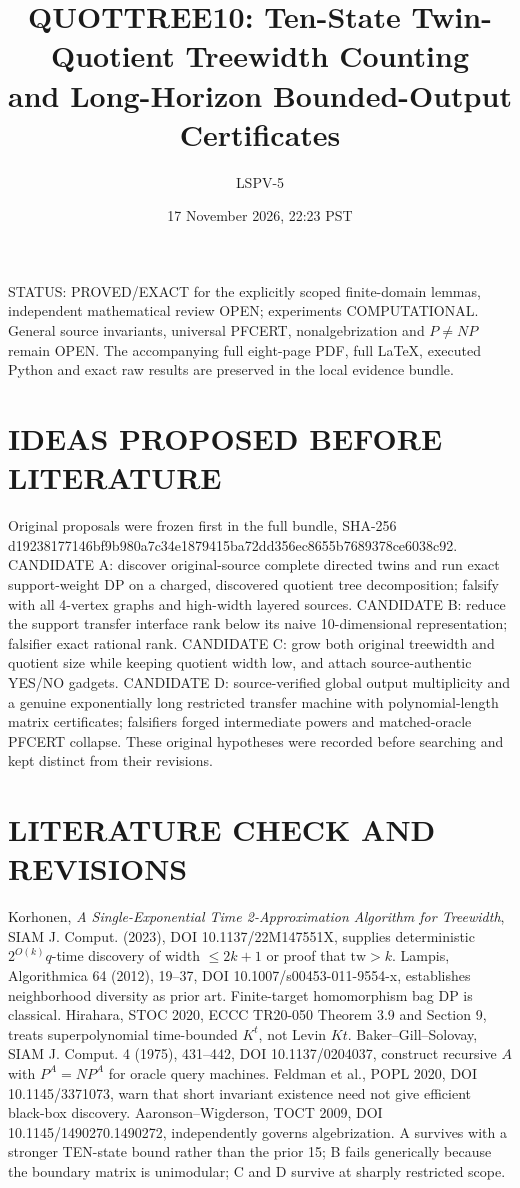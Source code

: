 \documentclass[11pt]{article}
\title{QUOTTREE10: Ten-State Twin-Quotient Treewidth Counting\\and Long-Horizon Bounded-Output Certificates}
\author{LSPV-5}
\date{17 November 2026, 22:23 PST}
\begin{document}
\maketitle
\noindent STATUS: PROVED/EXACT for the explicitly scoped finite-domain lemmas, independent mathematical review OPEN; experiments COMPUTATIONAL. General source invariants, universal PFCERT, nonalgebrization and $P\ne NP$ remain OPEN. The accompanying full eight-page PDF, full LaTeX, executed Python and exact raw results are preserved in the local evidence bundle.
\section{IDEAS PROPOSED BEFORE LITERATURE}
Original proposals were frozen first in the full bundle, SHA-256 d19238177146bf9b980a7c34e1879415ba72dd356ec8655b7689378ce6038c92. CANDIDATE A: discover original-source complete directed twins and run exact support-weight DP on a charged, discovered quotient tree decomposition; falsify with all 4-vertex graphs and high-width layered sources. CANDIDATE B: reduce the support transfer interface rank below its naive 10-dimensional representation; falsifier exact rational rank. CANDIDATE C: grow both original treewidth and quotient size while keeping quotient width low, and attach source-authentic YES/NO gadgets. CANDIDATE D: source-verified global output multiplicity and a genuine exponentially long restricted transfer machine with polynomial-length matrix certificates; falsifiers forged intermediate powers and matched-oracle PFCERT collapse. These original hypotheses were recorded before searching and kept distinct from their revisions.
\section{LITERATURE CHECK AND REVISIONS}
Korhonen, \emph{A Single-Exponential Time 2-Approximation Algorithm for Treewidth}, SIAM J. Comput. (2023), DOI 10.1137/22M147551X, supplies deterministic $2^{O(k)}q$-time discovery of width $\le2k+1$ or proof that $\mathrm{tw}>k$. Lampis, Algorithmica 64 (2012), 19--37, DOI 10.1007/s00453-011-9554-x, establishes neighborhood diversity as prior art. Finite-target homomorphism bag DP is classical. Hirahara, STOC 2020, ECCC TR20-050 Theorem 3.9 and Section 9, treats superpolynomial time-bounded $K^t$, not Levin $Kt$. Baker--Gill--Solovay, SIAM J. Comput. 4 (1975), 431--442, DOI 10.1137/0204037, construct recursive $A$ with $P^A=NP^A$ for oracle query machines. Feldman et al., POPL 2020, DOI 10.1145/3371073, warn that short invariant existence need not give efficient black-box discovery. Aaronson--Wigderson, TOCT 2009, DOI 10.1145/1490270.1490272, independently governs algebrization. A survives with a stronger TEN-state bound rather than the prior 15; B fails generically because the boundary matrix is unimodular; C and D survive at sharply restricted scope.
\end{document}
